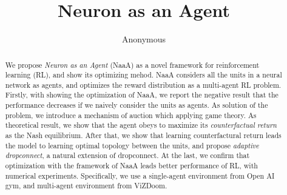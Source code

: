 \documentclass{article} %
\title{Neuron as an Agent}
\author{Anonymous}
\begin{document}
\maketitle

\begin{abstract}
We propose {\em Neuron as an Agent} (NaaA) as a novel framework for reinforcement learning (RL), and show its optimizing mehod.
NaaA considers all the units in a neural network as agents, and optimizes the reward distribution as a multi-agent RL problem.
Firstly, with showing the optimization of NaaA, we report the negative result that the performance decreases if we naively consider the units as agents.
As solution of the problem, we introduce a mechanism of auction which applying game theory.
As theoretical result, we show that the agent obeys to maximize its {\em counterfactual return} as the Nash equilibrium.
After that, we show that learning counterfactural return leads the model to learning optimal topology between the units,
and propose {\em adaptive dropconnect}, a natural extension of dropconnect.
At the last, we confirm that optimization with the framework of NaaA leads better performance of RL, with numerical experiments.
Specifically, we use a single-agent environment from Open AI gym, and multi-agent environment from ViZDoom.
\end{abstract}













\end{document}
